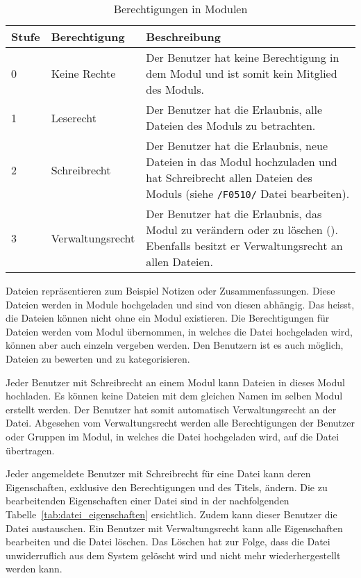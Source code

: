 \begin{table}[H]
\begin{tabularx}{\textwidth}{|l|l|X|} \hline
\textbf{Stufe} & \textbf{Berechtigung}     & \textbf{Beschreibung} \\ \hline
0     & Keine Rechte     & Der Benutzer hat keine Berechtigung in dem Modul und ist somit kein Mitglied des Moduls.\\ \hline
1     & Leserecht        & Der Benutzer hat die Erlaubnis, alle Dateien des Moduls zu betrachten.\\ \hline
2     & Schreibrecht     & Der Benutzer hat die Erlaubnis, neue Dateien in das Modul hochzuladen und hat Schreibrecht allen Dateien des Moduls (siehe \texttt{/F0510/} Datei bearbeiten).\\ \hline
3     & Verwaltungsrecht & Der Benutzer hat die Erlaubnis, das Modul zu verändern oder zu löschen ({Modul bearbeiten}). Ebenfalls besitzt er Verwaltungsrecht an allen Dateien. \\ \hline
\end{tabularx}
\caption{Berechtigungen in Modulen}
\label{tab:modul_rechte}
\end{table}
Dateien repräsentieren zum Beispiel Notizen oder Zusammenfassungen. Diese Dateien werden in Module hochgeladen und sind von diesen abhängig. Das heisst, die Dateien können nicht ohne ein Modul existieren. Die Berechtigungen für Dateien werden vom Modul übernommen, in welches die Datei hochgeladen wird, können aber auch einzeln vergeben werden. Den Benutzern ist es auch möglich, Dateien zu bewerten und zu kategorisieren.

Jeder Benutzer mit Schreibrecht an einem Modul kann Dateien in dieses Modul hochladen. Es können keine Dateien mit dem gleichen Namen im selben Modul erstellt werden. Der Benutzer hat somit automatisch Verwaltungsrecht an der Datei. Abgesehen vom Verwaltungsrecht werden alle Berechtigungen der Benutzer oder Gruppen im Modul, in welches die Datei hochgeladen wird, auf die Datei übertragen.

Jeder angemeldete Benutzer mit Schreibrecht für eine Datei kann deren Eigenschaften, exklusive den Berechtigungen und des Titels, ändern. Die zu bearbeitenden Eigenschaften einer Datei sind in der nachfolgenden Tabelle~\ref{tab:datei_eigenschaften} ersichtlich. Zudem kann dieser Benutzer die Datei austauschen. Ein Benutzer mit Verwaltungsrecht kann alle Eigenschaften bearbeiten und die Datei löschen. Das Löschen hat zur Folge, dass die Datei unwiderruflich aus dem System gelöscht wird und nicht mehr wiederhergestellt werden kann.

